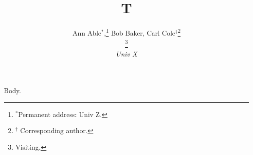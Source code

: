 \documentclass{article}
\begin{document}
\title{T}
\author{Ann Able$^\ast$,\thanks{$^\ast$Permanent address: Univ Z.} Bob Baker, Carl Cole$^\dag$\thanks{$^\dag$ Corresponding author.}\addtocounter{footnote}{-1}\thanks{Visiting.}\\ {\em Univ X}}
\maketitle
Body.
\end{document}
